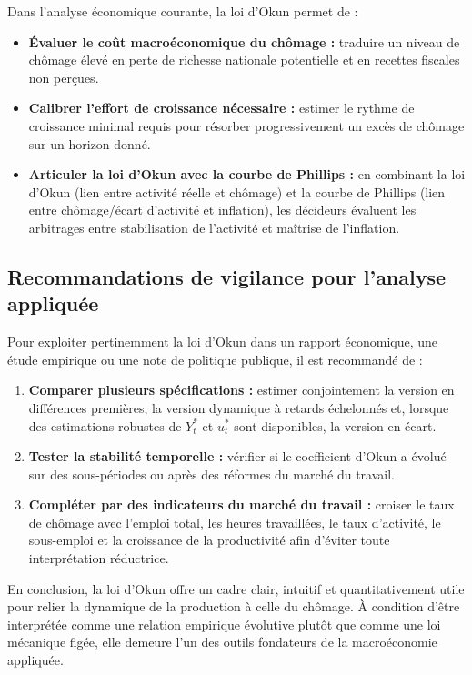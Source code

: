 \documentclass[11pt,a4paper]{article}
\begin{document}
Dans l'analyse économique courante, la loi d'Okun permet de :
\begin{itemize}[leftmargin=1.5em]
    \item \textbf{Évaluer le coût macroéconomique du chômage :} traduire un niveau de chômage élevé en perte de richesse nationale potentielle et en recettes fiscales non perçues.
    \item \textbf{Calibrer l'effort de croissance nécessaire :} estimer le rythme de croissance minimal requis pour résorber progressivement un excès de chômage sur un horizon donné.
    \item \textbf{Articuler la loi d'Okun avec la courbe de Phillips :} en combinant la loi d'Okun (lien entre activité réelle et chômage) et la courbe de Phillips (lien entre chômage/écart d'activité et inflation), les décideurs évaluent les arbitrages entre stabilisation de l'activité et maîtrise de l'inflation.
\end{itemize}

\subsection{Recommandations de vigilance pour l'analyse appliquée}

Pour exploiter pertinemment la loi d'Okun dans un rapport économique, une étude empirique ou une note de politique publique, il est recommandé de :
\begin{enumerate}[leftmargin=1.5em]
    \item \textbf{Comparer plusieurs spécifications :} estimer conjointement la version en différences premières, la version dynamique à retards échelonnés et, lorsque des estimations robustes de $Y_t^*$ et $u_t^*$ sont disponibles, la version en écart.
    \item \textbf{Tester la stabilité temporelle :} vérifier si le coefficient d'Okun a évolué sur des sous-périodes ou après des réformes du marché du travail.
    \item \textbf{Compléter par des indicateurs du marché du travail :} croiser le taux de chômage avec l'emploi total, les heures travaillées, le taux d'activité, le sous-emploi et la croissance de la productivité afin d'éviter toute interprétation réductrice.
\end{enumerate}

En conclusion, la loi d'Okun offre un cadre clair, intuitif et quantitativement utile pour relier la dynamique de la production à celle du chômage. À condition d'être interprétée comme une relation empirique évolutive plutôt que comme une loi mécanique figée, elle demeure l'un des outils fondateurs de la macroéconomie appliquée.
\end{document}
